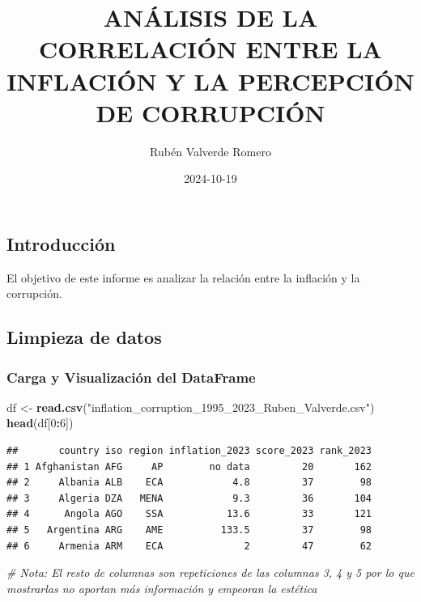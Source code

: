 \documentclass[
]{article}
\title{ANÁLISIS DE LA CORRELACIÓN ENTRE LA INFLACIÓN Y LA PERCEPCIÓN DE
CORRUPCIÓN}
\author{Rubén Valverde Romero}
\date{2024-10-19}
\newenvironment{Shaded}{\begin{snugshade}}{\end{snugshade}}
\newcommand{\CommentTok}[1]{\textcolor[rgb]{0.56,0.35,0.01}{\textit{#1}}}
\newcommand{\DecValTok}[1]{\textcolor[rgb]{0.00,0.00,0.81}{#1}}
\newcommand{\FunctionTok}[1]{\textcolor[rgb]{0.13,0.29,0.53}{\textbf{#1}}}
\newcommand{\NormalTok}[1]{#1}
\newcommand{\OtherTok}[1]{\textcolor[rgb]{0.56,0.35,0.01}{#1}}
\newcommand{\SpecialCharTok}[1]{\textcolor[rgb]{0.81,0.36,0.00}{\textbf{#1}}}
\newcommand{\StringTok}[1]{\textcolor[rgb]{0.31,0.60,0.02}{#1}}
\begin{document}
\maketitle

{
\setcounter{tocdepth}{2}
\tableofcontents
}
\subsection{Introducción}\label{introduccion}

El objetivo de este informe es analizar la relación entre la inflación y
la corrupción.

\subsection{Limpieza de datos}\label{limpieza-de-datos}

\subsubsection{Carga y Visualización del
DataFrame}\label{carga-y-visualizacion-del-dataframe}

\begin{Shaded}
\begin{Highlighting}[]
\NormalTok{df }\OtherTok{\textless{}{-}} \FunctionTok{read.csv}\NormalTok{(}\StringTok{"inflation\_corruption\_1995\_2023\_Ruben\_Valverde.csv"}\NormalTok{)}
\FunctionTok{head}\NormalTok{(df[}\DecValTok{0}\SpecialCharTok{:}\DecValTok{6}\NormalTok{])}
\end{Highlighting}
\end{Shaded}

\begin{verbatim}
##       country iso region inflation_2023 score_2023 rank_2023
## 1 Afghanistan AFG     AP        no data         20       162
## 2     Albania ALB    ECA            4.8         37        98
## 3     Algeria DZA   MENA            9.3         36       104
## 4      Angola AGO    SSA           13.6         33       121
## 5   Argentina ARG    AME          133.5         37        98
## 6     Armenia ARM    ECA              2         47        62
\end{verbatim}

\begin{Shaded}
\begin{Highlighting}[]
\CommentTok{\# Nota: El resto de columnas son repeticiones de las columnas 3, 4 y 5 por lo que mostrarlas no aportan más información y empeoran la estética}
\end{Highlighting}
\end{Shaded}
\end{document}
